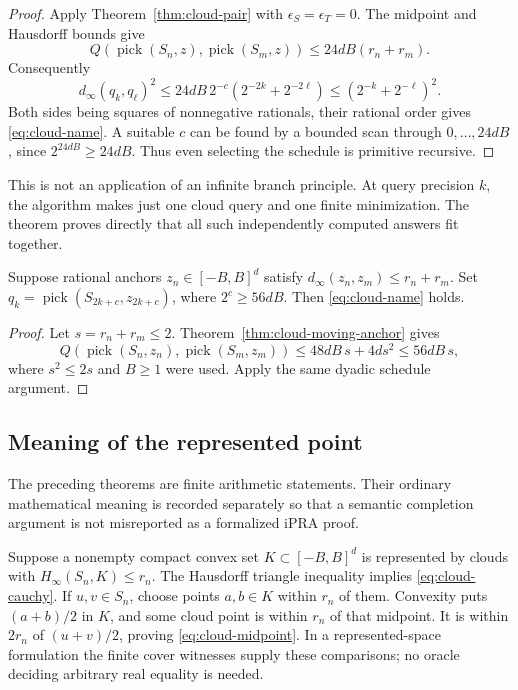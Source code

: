 \begin{proof}
Apply Theorem~\ref{thm:cloud-pair} with \(\epsilon_S=\epsilon_T=0\).
The midpoint and Hausdorff bounds give
\[
 Q(\operatorname{pick}(S_n,z),\operatorname{pick}(S_m,z))
 \leq 24dB(r_n+r_m).
\]
Consequently
\[
 d_\infty(q_k,q_\ell)^2
 \leq 24dB\,2^{-c}(2^{-2k}+2^{-2\ell})
 \leq (2^{-k}+2^{-\ell})^2.
\]
Both sides being squares of nonnegative rationals, their rational order gives
\eqref{eq:cloud-name}.  A suitable \(c\) can be found by a bounded scan
through \(0,\ldots,24dB\), since \(2^{24dB}\geq24dB\).
Thus even selecting the schedule is primitive recursive.
\end{proof}

This is not an application of an infinite branch principle.  At query
precision \(k\), the algorithm makes just one cloud query and one finite
minimization.  The theorem proves directly that all such independently
computed answers fit together.

\begin{corollary}
\label{cor:cloud-anchor-name}
Suppose rational anchors \(z_n\in[-B,B]^d\) satisfy
\(d_\infty(z_n,z_m)\leq r_n+r_m\).
Set \(q_k=\operatorname{pick}(S_{2k+c},z_{2k+c})\), where
\(2^c\geq56dB\).  Then \eqref{eq:cloud-name} holds.
\end{corollary}

\begin{proof}
Let \(s=r_n+r_m\leq2\).  Theorem~\ref{thm:cloud-moving-anchor} gives
\[
 Q(\operatorname{pick}(S_n,z_n),\operatorname{pick}(S_m,z_m))
 \leq48dB\,s+4d s^2
 \leq56dB\,s,
\]
where \(s^2\leq2s\) and \(B\geq1\) were used.  Apply the same
dyadic schedule argument.
\end{proof}

\subsection{Meaning of the represented point}

The preceding theorems are finite arithmetic statements.  Their ordinary
mathematical meaning is recorded separately so that a semantic completion
argument is not misreported as a formalized iPRA proof.

Suppose a nonempty compact convex set \(K\subset[-B,B]^d\) is represented
by clouds with \(H_\infty(S_n,K)\leq r_n\).  The Hausdorff triangle
inequality implies \eqref{eq:cloud-cauchy}.  If \(u,v\in S_n\), choose
points \(a,b\in K\) within \(r_n\) of them.  Convexity puts
\((a+b)/2\) in \(K\), and some cloud point is within \(r_n\) of that
midpoint.  It is within \(2r_n\) of \((u+v)/2\), proving
\eqref{eq:cloud-midpoint}.  In a represented-space formulation the finite
cover witnesses supply these comparisons; no oracle deciding arbitrary
real equality is needed.

